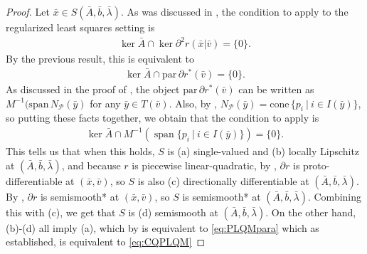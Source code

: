 \documentclass[reqno]{amsart}
\numberwithin{equation}{section}
\newcommand{\np}{N_{\mathcal{P}}}
\newcommand{\x}{\bar{x}}
\newcommand{\para}{\mathrm{par}\,}
\newcommand{\lin}{\mathrm{span}\,}
\newcommand{\cone}{\mathrm{cone}\,}
\begin{document}
\begin{proof}

Let $\bar{x} \in S(\bar{A}, \bar{b}, \bar{\lambda})$.
As was discussed in , the condition to apply  to the regularized least squares setting is
\begin{align*}
    \ker \bar{A} \cap \ker \partial^2 r(\bar x | \bar v) = \{0\}.
\end{align*} By the previous result, this is equivalent to
\begin{align}\label{eq:PLQMpara}
    \ker \bar{A} \cap \para \partial r^*(\bar v) = \{0\}.
\end{align} As discussed in the proof of , the object $\para \partial r^* (\bar v)$ can be written as $M^{-1}(\lin \np(\bar y)$ for any $\bar y \in T(\bar v)$. Also, by \cite[Theorem 6.46]{RoW 98}, $\np(\bar y) = \cone \{p_i \ | \ i \in I(\bar y)\}$, so putting these facts together, we obtain that the condition to apply  is \begin{align*}
    \ker \bar{A} \cap M^{-1}(\operatorname{span}\{p_i \ | \ i \in I(\bar{y})\}) = \{0\}.
\end{align*} This tells us that when this holds, $S$ is (a) single-valued and (b) locally Lipschitz at $(\bar A, \bar b, \bar \lambda)$, and because $r$ is piecewise linear-quadratic, by \cite[Remark 1]{FGH 22}, $\partial r$ is proto-differentiable at $(\x, \bar v)$, so $S$ is also (c) directionally differentiable at $(\bar A, \bar b, \bar \lambda)$. By \cite[Proposition 3]{FGH 22}, $\partial r$ is semismooth* at $(\bar x, \bar v)$, so $S$ is semismooth* at $(\bar A, \bar b, \bar \lambda)$. Combining this with (c), we get that $S$ is (d) semismooth at $(\bar A, \bar b, \bar \lambda)$. On the other hand, (b)-(d) all imply (a), which by \cite[Theorem 3]{CHNS 26} is equivalent to \eqref{eq:PLQMpara} which as established, is equivalent to \eqref{eq:CQPLQM}
\end{proof}

\end{document}
